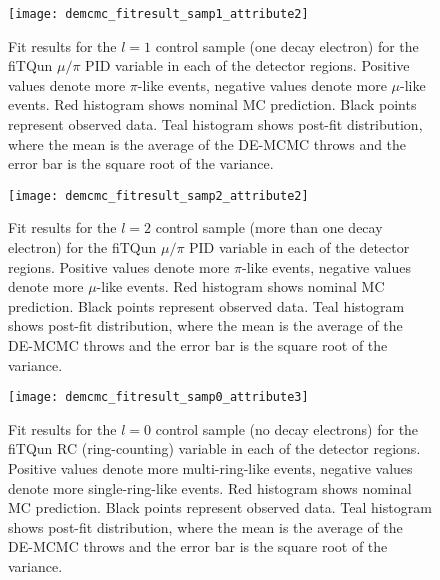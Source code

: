\begin{figure}[h]
  \begin{center}
    \texttt{[image: demcmc\_fitresult\_samp1\_attribute2]} 
  \end{center}
  \caption{Fit results for the $l=1$ control sample (one decay electron) for
  the fiTQun $\mu/\pi$ PID variable in each of the detector regions.  Positive
  values denote more $\pi$-like events, negative values denote more $\mu$-like
  events. Red histogram shows nominal MC prediction.  Black points represent
  observed data.  Teal histogram shows post-fit distribution, where the mean is
  the average of the DE-MCMC throws and the error bar is the square root of the
  variance.} 
  \label{fig:fitresults_samp1_att2}
\end{figure}


\begin{figure}[h]
  \begin{center}
    \texttt{[image: demcmc\_fitresult\_samp2\_attribute2]} 
  \end{center}
  \caption{Fit results for the $l=2$ control sample (more than one decay
  electron) for the fiTQun $\mu/\pi$ PID variable in each of the detector
  regions.  Positive values denote more $\pi$-like events, negative values
  denote more $\mu$-like events. Red histogram shows nominal MC prediction.
  Black points represent observed data.  Teal histogram shows post-fit
  distribution, where the mean is the average of the DE-MCMC throws and the
  error bar is the square root of the variance.}
  \label{fig:fitresults_samp2_att2}
\end{figure}


\begin{figure}[h]
  \begin{center}
    \texttt{[image: demcmc\_fitresult\_samp0\_attribute3]} 
  \end{center}
  \caption{Fit results for the $l=0$ control sample (no decay electrons) for
  the fiTQun RC (ring-counting) variable in each of the detector regions.
  Positive values denote more multi-ring-like events, negative values denote
  more single-ring-like events. Red histogram shows nominal MC prediction.
  Black points represent observed data.  Teal histogram shows post-fit
  distribution, where the mean is the average of the DE-MCMC throws and the
  error bar is the square root of the variance.}
  \label{fig:fitresults_samp0_att3}
\end{figure}



